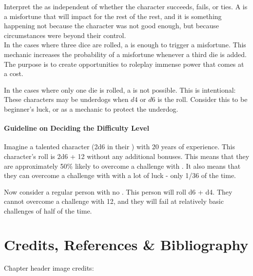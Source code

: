 Interpret the  as independent of whether the character
succeeds, fails, or ties. A  is a misfortune that will
impact for the rest of the rest, and it is something happening not
because the character was not good enough, but because circumstances were
beyond their control.\\


In the cases where three dice are rolled,
a  is enough to trigger a misfortune.
This mechanic increases the probability of a misfortune
whenever a third die is added. The purpose is to create
opportunities to roleplay immense power that comes at a
cost.\\

In the cases where only one die is rolled,
a  is not possible. This is intentional:
These characters may be underdogs when $d4$ or $d6$ is the roll.
Consider this to be beginner's luck, or as a mechanic to protect the
underdog.\\

\paragraph*{Guideline on Deciding the Difficulty Level}

Imagine a talented character (2d6 in their ) with 20 years of experience.
This character's roll is 2d6 + 12 without any additional bonuses.
This means that they are approximately 50\% likely to overcome a challenge with .
It also means that they can overcome a challenge with  with a lot of luck - only 1/36 of the time.\\

\marginpar{
	\footnotesize
	
}

Now consider a regular person with no . This person will roll d6 + d4.
They cannot overcome a challenge with 12,
and they will fail at relatively basic challenges of  half of the time.\\

\section*{Credits, References \& Bibliography}

Chapter header image credits: \cite{dice_image}

\printbibliography[heading=none]
